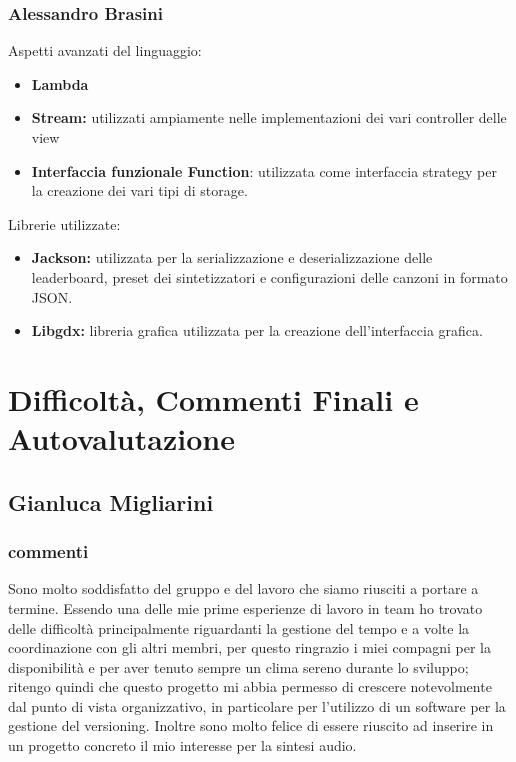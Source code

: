 \documentclass[a4paper,12pt]{report}
\begin{document}
\subsection{Alessandro Brasini}
Aspetti avanzati del linguaggio:
\begin{itemize}
	\item \textbf{Lambda}
	\item \textbf{Stream:} utilizzati ampiamente nelle implementazioni dei vari controller delle view
	\item \textbf{Interfaccia funzionale Function}: utilizzata come interfaccia strategy per la creazione dei vari tipi di storage.
\end{itemize}
Librerie utilizzate:
\begin{itemize}
	\item \textbf{Jackson:} utilizzata per la serializzazione e deserializzazione delle leaderboard, preset dei sintetizzatori e configurazioni delle canzoni
	in formato JSON.
	\item \textbf{Libgdx:} libreria grafica utilizzata per la creazione dell'interfaccia grafica.
\end{itemize}
\newpage




\chapter{Difficoltà, Commenti Finali e Autovalutazione}


\section{Gianluca Migliarini}
\subsection{commenti}
Sono molto soddisfatto del gruppo e del lavoro che siamo riusciti a portare a termine.
Essendo una delle mie prime esperienze di lavoro in team ho trovato delle difficoltà principalmente riguardanti
la gestione del tempo e a volte la coordinazione con gli altri membri, per questo ringrazio i miei compagni per la disponibilità e per aver tenuto sempre un clima sereno durante lo sviluppo; ritengo quindi che questo progetto mi abbia permesso di crescere notevolmente dal punto di vista organizzativo, in particolare per l'utilizzo di un software per la gestione del versioning.
Inoltre sono molto felice di essere riuscito ad inserire in un progetto concreto il mio interesse per la sintesi audio.
\end{document}
